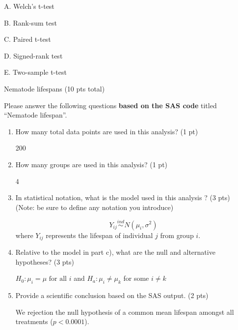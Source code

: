 \documentclass[10pt,draft]{article}
\newcommand{\bigbrk}{\vspace*{2in}}
\newcommand{\correct}[1]{{\color{red} #1}}
\newcommand{\shortcorrect}[1]{{\color{red} #1}}
\newcommand{\longcorrect}[2][\bigbrk]{{\color{red} #2}}
\newcommand{\correct}[1]{\underline{\phantom{XXXXXX}}}
\newcommand{\shortcorrect}[1]{{\phantom{33.33}}}
\newcommand{\longcorrect}[2][\bigbrk]{#1}
\begin{document}
\begin{minipage}{0.4\linewidth}
{\Huge

\vspace{-0.2in}

A.\correct{Welch's t-test}

\vspace{1.2in}

B.\correct{Rank-sum test}

\vspace{1.2in}

C.\correct{Paired t-test}

\vspace{1.2in}

D.\correct{Signed-rank test}

\vspace{1.2in}

E.\correct{Two-sample t-test}
}
\end{minipage}



\newpage
\noindent \begin{Large}Nematode lifespans (10 pts total) \end{Large}

\bigskip

Please answer the following questions {\bf based on the SAS code} titled ``Nematode lifespan''.

\begin{enumerate}
\item How many total data points are used in this analysis? (1 pt)

\shortcorrect{200}

\item How many groups are used in this analysis? (1 pt)

\shortcorrect{4} 

\item In statistical notation, what is the model used in this analysis ? (3 pts)\\
(Note: be sure to define any notation you introduce)

\longcorrect{\[Y_{ij}\stackrel{ind}{\sim} N(\mu_i,\sigma^2)\] where $Y_{ij}$ represents the lifespan of individual $j$ from group $i$.} 

\item Relative to the model in part c), what are the null and alternative hypotheses? (3 pts) 

\longcorrect{$H_0:\mu_i=\mu\mbox{ for all } i$ and $H_a:\mu_i\ne \mu_k$ for some $i\ne k$}

\item Provide a scientific conclusion based on the SAS output. (2 pts)

\longcorrect{We rejection the null hypothesis of a common mean lifespan amongst all treatments ($p<0.0001$).}

\end{enumerate}
\end{document}
